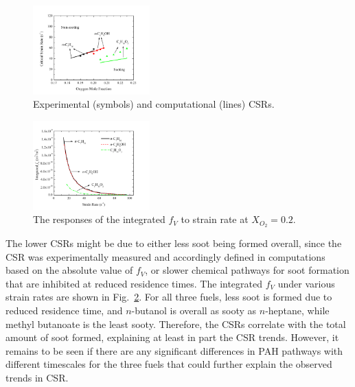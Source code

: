 \documentclass[review,3p,times]{elsarticleUS}
\begin{document}
\begin{figure}[ht]
  \centering
  \scriptsize
  \vspace{0.5in}
  \includegraphics[trim=4mm 8mm 30mm 20mm, clip=true, width=0.4\textwidth]{Exp-Comp.png}
  \normalsize
  \vspace{-0.1in}
  \caption{Experimental (symbols) and computational (lines) CSRs.}
  \label{fig:Exp-Comp}
\end{figure}

\begin{figure}[ht]
  \centering
  \scriptsize
  \vspace{-0.1in}
  \includegraphics[trim=4mm 8mm 30mm 20mm, clip=true, width=0.4\textwidth]{SV-SR.png}
  \normalsize
  \vspace{-0.1in}
  \caption{The responses of the integrated $f_V$ to strain rate at $X_{O_2}=0.2$.}
  \label{fig:fv}
\end{figure}

The lower CSRs might be due to either less soot being formed overall, since the CSR was experimentally measured and accordingly defined in computations based on the absolute value of $f_V$, or slower chemical pathways for soot formation that are inhibited at reduced residence times. The integrated $f_V$ under various strain rates are shown in Fig.~\ref{fig:fv}. For all three fuels, less soot is formed due to reduced residence time, and $n$-butanol is overall as sooty as $n$-heptane, while methyl butanoate is the least sooty. Therefore, the CSRs correlate with the total amount of soot formed, explaining at least in part the CSR trends. However, it remains to be seen if there are any significant differences in PAH pathways with different timescales for the three fuels that could further explain the observed trends in CSR.
\end{document}

